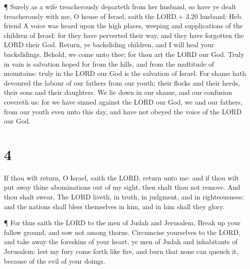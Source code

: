  ¶ Surely as a wife treacherously departeth from her
husband, so have ye dealt treacherously with me, O house of Israel,
saith the LORD.+ 3.20 husband: Heb. friend  A voice was
heard upon the high places, weeping and supplications of the children of
Israel: for they have perverted their way, and they have forgotten the
LORD their God.  Return, ye backsliding children, and I
will heal your backslidings. Behold, we come unto thee; for thou art the
LORD our God.  Truly in vain is salvation hoped for from
the hills, and from the multitude of mountains: truly in the LORD our
God is the salvation of Israel.  For shame hath devoured
the labour of our fathers from our youth; their flocks and their herds,
their sons and their daughters.  We lie down in our shame,
and our confusion covereth us: for we have sinned against the LORD our
God, we and our fathers, from our youth even unto this day, and have not
obeyed the voice of the LORD our God.

\hypertarget{section-3}{%
\section{4}\label{section-3}}

 If thou wilt return, O Israel, saith the LORD, return unto
me: and if thou wilt put away thine abominations out of my sight, then
shalt thou not remove.  And thou shalt swear, The LORD
liveth, in truth, in judgment, and in righteousness; and the nations
shall bless themselves in him, and in him shall they glory.

 ¶ For thus saith the LORD to the men of Judah and
Jerusalem, Break up your fallow ground, and sow not among thorns.
 Circumcise yourselves to the LORD, and take away the
foreskins of your heart, ye men of Judah and inhabitants of Jerusalem:
lest my fury come forth like fire, and burn that none can quench it,
because of the evil of your doings.


